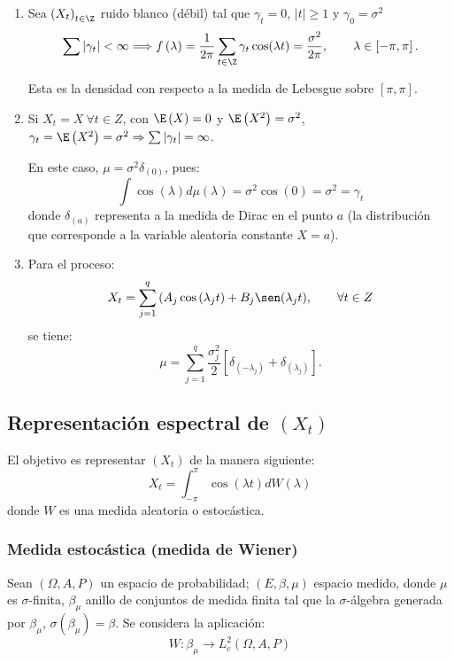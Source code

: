 \begin{ejemplo}
 \begin{enumerate}
\item Sea $\left( X_{t} \right)_{t\in \Z}$ ruido blanco (d\'{e}bil) tal que $\gamma_{t}=0$, $\left| t \right|\geq 1$ y $\gamma_{0}=\sigma^{2}$
\[
\sum \left| \gamma_{t} \right| <\infty \Longrightarrow f\left( \lambda \right)=
\frac{1}{2\pi }\sum_{t\in \Z} {\gamma_{t}\cos(\lambda t)} 
=\frac{\sigma^{2}}{2\pi },\qquad \lambda \in \left[ -\pi ,\pi \right].
\]

Esta es la densidad con respecto a la medida de Lebesgue sobre $\left[ \pi ,\pi \right]$.

\item Si $X_{t}=X\ \forall t\in Z$, con $\E\left( X \right)=0$ y $\E\left( X^{2} \right)=\sigma^{2}$, $\gamma_{t}=\E\left( X^{2} \right)=\sigma^{2}\Rightarrow \sum \left| \gamma_{t} \right| =\infty $. 

En este caso, $\mu =\sigma^{2}\delta_{(0)}$, pues: 
\[
\int {\cos(\lambda )d\mu (\lambda )} =\sigma^{2}\cos \left( 0 \right)=\sigma 
^{2}=\gamma_{t}
\]
donde $\delta_{(a)}$ representa a la medida de Dirac en el punto $a$ (la distribuci\'{o}n que corresponde a la variable aleatoria constante $X=a$).

\item Para el proceso:
\[
X_{t}=\sum_{j=1}^q {(A_{j}\cos \left( \lambda_{j}t 
\right)+B_{j}\sen(\lambda_{j}t)} ,\qquad \forall t\in Z
\]
se tiene:
\[
\mu =\sum_{j=1}^q {\frac{\sigma_{j}^{2}}{2}\left[ \delta_{(-\lambda 
_{j})}+\delta_{(\lambda_{j})} \right]}. 
\]
\end{enumerate}
\end{ejemplo}


\subsection{Representaci\'{o}n espectral de 
$(X_{t})$ }
\label{subsubsec:mylabel2}
El objetivo es representar $(X_{t})$ de la manera siguiente:
\[
X_{t}=\int_{-\pi }^\pi {\cos(\lambda t)dW(\lambda )} 
\]
donde $W$ es una medida aleatoria o estoc\'{a}stica.

\subsubsection{Medida estoc\'{a}stica 
(medida de Wiener)}

Sean $\left(\Omega,A,P \right)$ un espacio de probabilidad; $(E,\beta, \mu )$ espacio medido, donde $\mu $ es $\sigma 
$-finita, $\beta_{\mu }$ anillo de conjuntos de medida finita tal que la $\sigma $-\'{a}lgebra generada por $\beta_{\mu }$, $\sigma \left( \beta_{\mu } \right)=\beta $. Se considera la aplicaci\'{o}n:
\[
W:\beta_{\mu }\to L_{c}^{2}\left( \Omega,A,P \right)
\]

